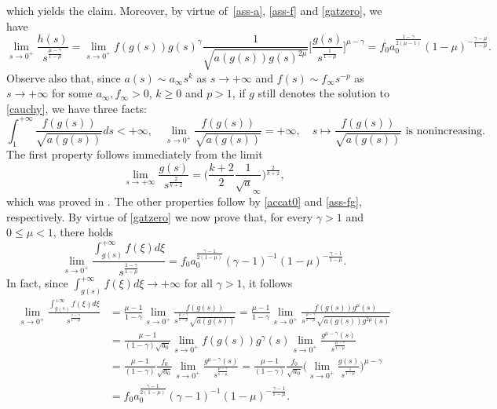 \documentclass[10pt]{amsart}
\numberwithin{equation}{section}
\theoremstyle{definition}
\begin{document}
which yields the claim. Moreover, by virtue of~\eqref{ass-a}, \eqref{ass-f} and \eqref{gatzero}, we have
\begin{equation}
	\label{accat0}
\lim_{s\to 0^+}\frac{h(s)}{s^{\frac{\mu-\gamma}{1-\mu}}}=
\lim_{s\to 0^+} f(g(s))g(s)^{\gamma}\frac{1}{\sqrt{a(g(s))g(s)^{2\mu}}}
\Big[\frac{g(s)}{s^{\frac{1}{1-\mu}}}\Big]^{\mu-\gamma}=
f_0 a_0^{\frac{1-\gamma}{2(\mu-1)}}(1-\mu)^{-\frac{\gamma-\mu}{1-\mu}}.
\end{equation}
Observe also that, since $a(s)\sim a_\infty s^k$ as $s\to+\infty$
and $f(s)\sim f_\infty s^{-p}$ as $s\to+\infty$ for some $a_\infty,f_\infty>0$, $k\geq 0$ and $p>1$,
if $g$ still denotes the solution to \eqref{cauchy}, we have three facts:
	\begin{equation}
		\label{limzze}
		\int_1^{+\infty}\frac{f(g(s))}{\sqrt{a(g(s))}}ds<+\infty,  \quad
\lim_{s\to 0^+}\frac{f(g(s))}{\sqrt{a(g(s))}}=+\infty,\quad
\text{$s\mapsto \frac{f(g(s))}{\sqrt{a(g(s))}}$ is nonincreasing.}
	\end{equation} 
The first property follows immediately from the limit
\begin{equation*}
\lim_{s\to +\infty}\frac{g(s)}{s^{\frac 2{k+2}}}=\big(\frac{k+2} 2 \frac 1{\sqrt a_\infty} \big)^{\frac 2{k+2}},
\end{equation*}
which was proved in \cite{GlasquII}. The other properties follow by \eqref{accat0} and
\eqref{ass-fg}, respectively. By virtue of \eqref{gatzero} we now prove that, 
for every $\gamma>1$ and $0\leq \mu<1$, there holds
\begin{equation}
	\label{limfracintt}
\lim_{s\to 0^+}\frac{\int_{g(s)}^{+\infty} f(\xi)d\xi}{s^{\frac{1-\gamma}{1-\mu}}}=f_0 a_0^{\frac{\gamma-1}{2(1-\mu)}}(\gamma-1)^{-1}
(1-\mu)^{-\frac{\gamma-1}{1-\mu}}.
\end{equation}
In fact, since $\int_{g(s)}^{+\infty} f(\xi)d\xi\to +\infty$ for all $\gamma>1$, it follows
\begin{align*}
\lim_{s\to 0^+}\frac{\int_{g(s)}^{+\infty} f(\xi)d\xi}{s^{\frac{1-\gamma}{1-\mu}}}&=
\frac{\mu-1}{1-\gamma}\lim_{s\to 0^+}\frac{f(g(s))}{s^{\frac{\mu-\gamma}{1-\mu}}\sqrt{a(g(s))}}
=\frac{\mu-1}{1-\gamma}\lim_{s\to 0^+}\frac{f(g(s))g^\mu(s)}{s^{\frac{\mu-\gamma}{1-\mu}}\sqrt{a(g(s))g^{2\mu}(s)}} \\
& =\frac{\mu-1}{(1-\gamma)\sqrt{a_0}}\lim_{s\to 0^+}f(g(s))g^\gamma(s)
\lim_{s\to 0^+}\frac{g^{\mu-\gamma}(s)}{s^{\frac{\mu-\gamma}{1-\mu}}} \\
& =\frac{\mu-1}{(1-\gamma)}\frac{f_0}{\sqrt{a_0}}
\lim_{s\to 0^+}\frac{g^{\mu-\gamma}(s)}{s^{\frac{\mu-\gamma}{1-\mu}}} 
=\frac{\mu-1}{(1-\gamma)}\frac{f_0}{\sqrt{a_0}}
\Big(\lim_{s\to 0^+}\frac{g(s)}{s^{\frac{1}{1-\mu}}}\Big)^{\mu-\gamma} \\
& =f_0 a_0^{\frac{\gamma-1}{2(1-\mu)}}(\gamma-1)^{-1}
(1-\mu)^{-\frac{\gamma-1}{1-\mu}}.
\end{align*}
\end{document}
